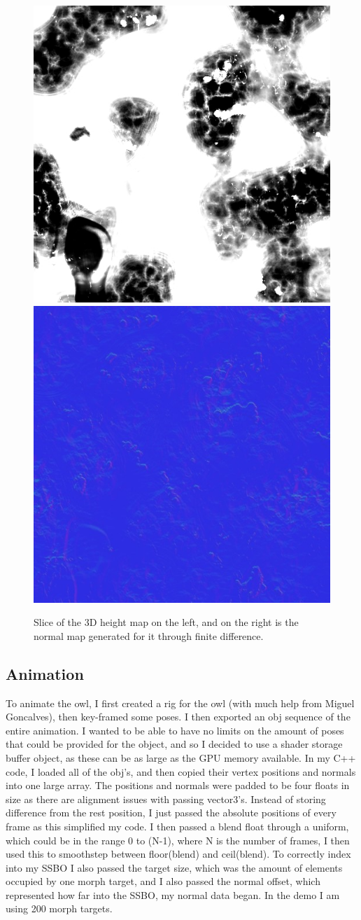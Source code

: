 \documentclass[]{acmsiggraph}
\begin{document}
\begin{figure}[htbp]
  \centering
 {\includegraphics[width=0.46\linewidth]{images/height_slice.jpg}}
 \hfill
 {\includegraphics[width=0.46\linewidth]{images/normal_slice.jpg}}
  \caption{\label{fig:normals}Slice of the 3D height map on the left, and on the right is the normal map generated for it through finite difference.}
\end{figure}

\subsection{Animation}

To animate the owl, I first created a rig for the owl (with much help from Miguel Goncalves), then key-framed some poses. I then exported an obj sequence of the entire animation. I wanted to be able to have no limits on the amount of poses that could be provided for the object, and so I decided to use a shader storage buffer object, as these can be as large as the GPU memory available. In my C++ code, I loaded all of the obj's, and then copied their vertex positions and normals into one large array. The positions and normals were padded to be four floats in size as there are alignment issues with passing vector3's. Instead of storing difference from the rest position, I just passed the absolute positions of every frame as this simplified my code. I then passed a blend float through a uniform, which could be in the range 0 to (N-1), where N is the number of frames, I then used this to smoothstep between floor(blend) and ceil(blend). To correctly index into my SSBO I also passed the target size, which was the amount of elements occupied by one morph target, and I also passed the normal offset, which represented how far into the SSBO, my normal data began. In the demo I am using 200 morph targets.
\end{document}
